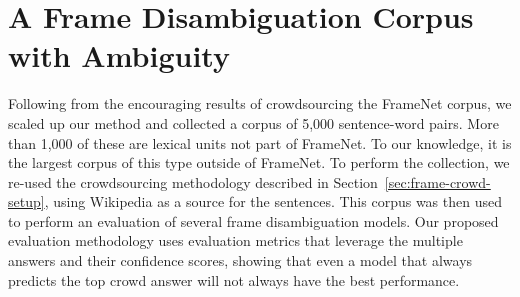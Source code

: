 \section{A Frame Disambiguation Corpus with Ambiguity}
\label{sec:frame-disambig-eval}

Following from the encouraging results of crowdsourcing the FrameNet corpus, we scaled up our method and collected a corpus of 5,000 sentence-word pairs. More than 1,000 of these are lexical units not part of FrameNet. To our knowledge, it is the largest corpus of this type outside of FrameNet. To perform the collection, we re-used the crowdsourcing methodology described in Section~\ref{sec:frame-crowd-setup}, using Wikipedia as a source for the sentences. This corpus was then used to perform an evaluation of several frame disambiguation models. Our proposed evaluation methodology uses evaluation metrics that leverage the multiple answers and their confidence scores, showing that even a model that always predicts the top crowd answer will not always have the best performance.


